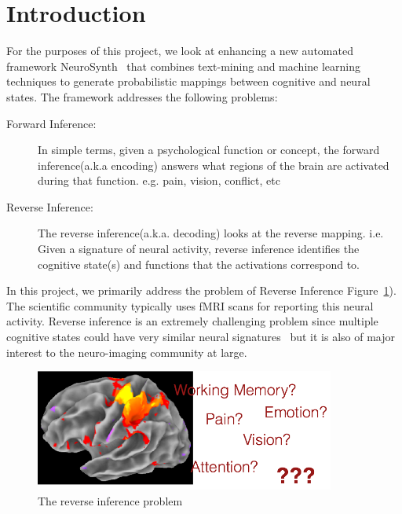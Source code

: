 \documentclass{article} %
\begin{document}
\section{Introduction}
For the purposes of this project, we look at enhancing a new automated framework NeuroSynth~\cite{yarkoni2011large}  that combines text-mining and machine learning techniques to generate probabilistic mappings between cognitive and neural states. The framework addresses the following problems:
\begin{description}
\item[Forward Inference: ] In simple terms, given a psychological function or concept, the forward inference(a.k.a encoding) answers what regions of the brain are activated during that function. e.g. pain, vision, conflict, etc
\item[Reverse Inference: ] The reverse inference(a.k.a. decoding) looks at the reverse mapping. i.e. Given a signature of neural activity, reverse inference identifies the cognitive state(s) and functions that the activations correspond to.
\end{description}
In this project, %
we primarily address the problem of Reverse Inference Figure~\ref{fig:revinf}). The scientific community typically uses fMRI scans for reporting this neural activity. Reverse inference is an extremely challenging problem since multiple cognitive states could have very similar neural signatures~\cite{yarkoni2011large} but it is also of major interest to the neuro-imaging community at large.

\begin{figure}[h]
\begin{center}
\includegraphics[height=4cm]{revinf.png}
\end{center}
\caption{The reverse inference problem}
\label{fig:revinf}
\end{figure}
\end{document}
